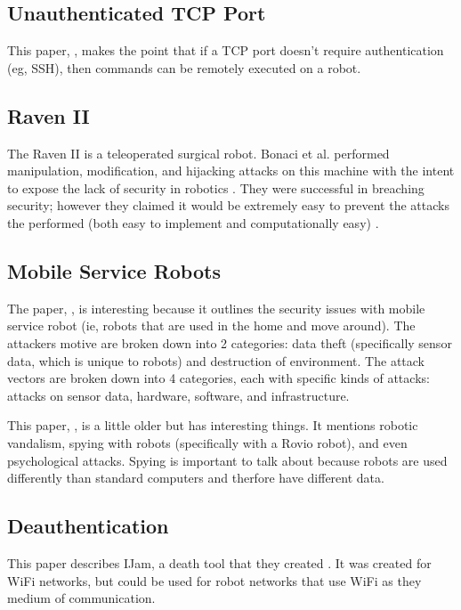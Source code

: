 
\subsection{Unauthenticated TCP Port}
This paper, \cite{Miller:2018}, makes the point that if a TCP port doesn't require authentication (eg, SSH), then commands can be remotely executed on a robot.


\subsection{Raven II}
The Raven II is a teleoperated surgical robot. Bonaci et al. performed manipulation, modification, and hijacking attacks on this machine with the intent to expose the lack of security in robotics \cite{BonaciHYYKC15}. They were successful in breaching security; however they claimed it would be extremely easy to prevent the attacks the performed (both easy to implement and computationally easy) \cite{BonaciHYYKC15}.

\subsection{Mobile Service Robots}
The paper, \cite{Cornelius}, is interesting because it outlines the security issues with mobile service robot (ie, robots that are used in the home and move around). The attackers motive are broken down into 2 categories: data theft (specifically sensor data, which is unique to robots) and destruction of environment. The attack vectors are broken down into 4 categories, each with specific kinds of attacks: attacks on sensor data, hardware, software, and infrastructure. 

This paper, \cite{Denning:2009}, is a little older but has interesting things. It mentions robotic vandalism, spying with robots (specifically with a Rovio robot), and even psychological attacks. Spying is important to talk about because robots are used differently than standard computers and therfore have different data.

\subsection{Deauthentication}
This paper describes IJam, a death tool that they created \cite{Al-Ani:2017}. It was created for WiFi networks, but could be used for robot networks that use WiFi as they medium of communication.


